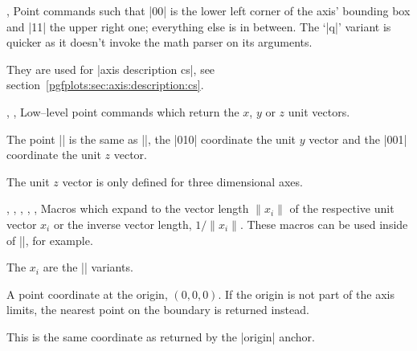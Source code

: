 \begin{commandlist}{%
	\pgfplotspointdescriptionxy{},%
	\pgfplotsqpointdescriptionxy{}}%
	Point commands such that |{0}{0}| is the lower left corner of the axis' bounding box and |{1}{1}| the upper right one; everything else is in between. The `|q|' variant is quicker as it doesn't invoke the math parser on its arguments.

	They are used for |axis description cs|, see section~\ref{pgfplots:sec:axis:description:cs}.
\end{commandlist}

\begin{commandlist}{%
	\pgfplotspointunitx,%
	\pgfplotspointunity,%
	\pgfplotspointunitz}%
	Low--level point commands which return the $x$, $y$ or $z$ unit vectors.

	The point || is the same as |\pgfplotspointunitx|, the |{0}{1}{0}| coordinate the unit $y$ vector and the |{0}{0}{1}| coordinate the unit $z$ vector.

	The unit $z$ vector is only defined for three dimensional axes.
\end{commandlist}

\begin{commandlist}{%
	\pgfplotsunitxlength,%
	\pgfplotsunitylength,%
	\pgfplotsunitzlength,%
	\pgfplotsunitxinvlength,%
	\pgfplotsunityinvlength,%
	\pgfplotsunitzinvlength}%
	Macros which expand to the vector length $\lVert x_i \rVert$ of the respective unit vector $x_i$ or the inverse vector length, $1/\lVert x_i \rVert$. These macros can be used inside of |\pgfmathparse|, for example.

	The $x_i$ are the |\pgfplotspointunitx| variants.
\end{commandlist}

\begin{commandlist}{\pgfplotspointaxisorigin}
	A point coordinate at the origin, $(0,0,0)$. If the origin is not part of the axis limits, the nearest point on the boundary is returned instead.

	This is the same coordinate as returned by the |origin| anchor.
\end{commandlist}

